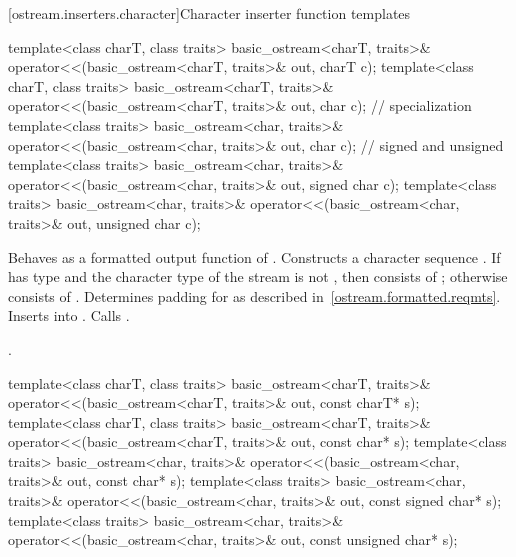 [ostream.inserters.character]{Character inserter function templates}

%
\begin{itemdecl}
template<class charT, class traits>
  basic_ostream<charT, traits>& operator<<(basic_ostream<charT, traits>& out, charT c);
template<class charT, class traits>
  basic_ostream<charT, traits>& operator<<(basic_ostream<charT, traits>& out, char c);
// specialization
template<class traits>
  basic_ostream<char, traits>& operator<<(basic_ostream<char, traits>& out, char c);
// signed and unsigned
template<class traits>
  basic_ostream<char, traits>& operator<<(basic_ostream<char, traits>& out, signed char c);
template<class traits>
  basic_ostream<char, traits>& operator<<(basic_ostream<char, traits>& out, unsigned char c);
\end{itemdecl}

\begin{itemdescr}
\pnum
\effects
Behaves as a formatted output function
of . Constructs a character sequence .
If  has type
and the character type of the stream is not
,
then  consists of
;
otherwise  consists of
. Determines padding for  as described
in~\ref{ostream.formatted.reqmts}. Inserts  into
. Calls .

\pnum
\returns
{}.
\end{itemdescr}

%
\begin{itemdecl}
template<class charT, class traits>
  basic_ostream<charT, traits>& operator<<(basic_ostream<charT, traits>& out, const charT* s);
template<class charT, class traits>
  basic_ostream<charT, traits>& operator<<(basic_ostream<charT, traits>& out, const char* s);
template<class traits>
  basic_ostream<char, traits>& operator<<(basic_ostream<char, traits>& out, const char* s);
template<class traits>
  basic_ostream<char, traits>& operator<<(basic_ostream<char, traits>& out, const signed char* s);
template<class traits>
  basic_ostream<char, traits>& operator<<(basic_ostream<char, traits>& out,
                                          const unsigned char* s);
\end{itemdecl}

